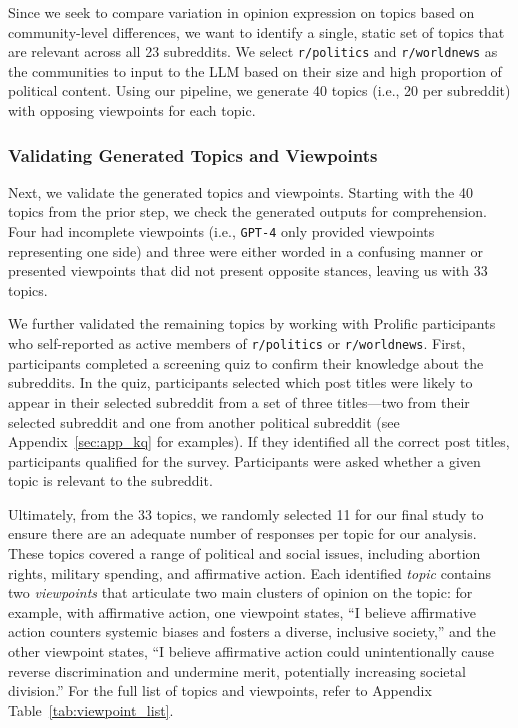 Since we seek to compare variation in opinion expression on topics based on community-level differences, we want to identify a single, static set of topics that are relevant across all 23 subreddits. We select \texttt{r/politics} and \texttt{r/worldnews} as the communities to input to the LLM based on their size and high proportion of political content. Using our pipeline, we generate 40 topics (i.e., 20 per subreddit) with opposing viewpoints for each topic.

\subsubsection{Validating Generated Topics and Viewpoints}
\label{sec:valid_generate}
Next, we validate the generated topics and viewpoints. Starting with the 40 topics from the prior step, we check the generated outputs for comprehension. Four had incomplete viewpoints (i.e., \texttt{GPT-4} only provided viewpoints representing one side) and three were either worded in a confusing manner or presented viewpoints that did not present opposite stances, leaving us with 33 topics. 

We further validated the remaining topics by working with Prolific participants who self-reported as active members of \texttt{r/politics} or \texttt{r/worldnews}. First, participants completed a screening quiz to confirm their knowledge about the subreddits. In the quiz, participants selected which post titles were likely to appear in their selected subreddit from a set of three titles---two from their selected subreddit and one from another political subreddit (see Appendix~\ref{sec:app_kq} for examples). If they identified all the correct post titles, participants qualified for the survey. Participants were asked whether a given topic is relevant to the subreddit.

Ultimately, from the 33 topics, we randomly selected 11 for our final study to ensure there are an adequate number of responses per topic for our analysis. These topics covered a range of political and social issues, including abortion rights, military spending, and affirmative action. Each identified \textit{topic} contains two \textit{viewpoints} that articulate two main clusters of opinion on the topic: for example, with affirmative action, one viewpoint states, ``I believe affirmative action counters systemic
biases and fosters a diverse, inclusive society,'' and the other viewpoint states, ``I believe affirmative action could unintentionally
cause reverse discrimination and undermine merit,
potentially increasing societal division.'' For the full list of topics and viewpoints, refer to Appendix Table~\ref{tab:viewpoint_list}. 




